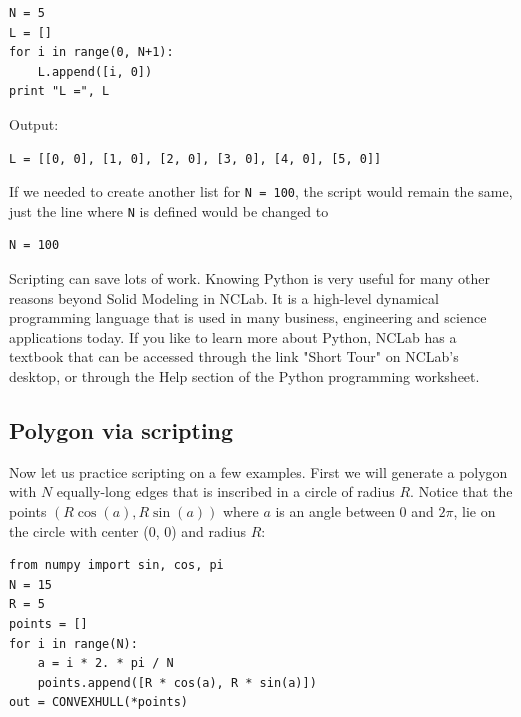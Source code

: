 \begin{bbox}
\begin{verbatim}
N = 5
L = []
for i in range(0, N+1):
    L.append([i, 0])
print "L =", L
\end{verbatim}
\end{bbox}
\vspace{6mm}

\noindent
Output:\\
\begin{ybox}
\begin{verbatim}
L = [[0, 0], [1, 0], [2, 0], [3, 0], [4, 0], [5, 0]]
\end{verbatim}
\end{ybox}
\vspace{6mm}

\noindent
If we needed to create another list for {\tt N = 100}, the script would remain the same,
just the line where {\tt N} is defined would be changed to \\

\begin{bbox}
\begin{verbatim}
N = 100
\end{verbatim}
\end{bbox}
\vspace{6mm}

\noindent
Scripting can save lots of work. Knowing Python is very useful for many other
reasons beyond Solid Modeling in NCLab. It is a high-level dynamical programming 
language that is used in many business, engineering and science applications 
today. If you like to learn more about Python, NCLab has a textbook that can be 
accessed through the link "Short Tour" on NCLab's desktop, or through the Help
section of the Python programming worksheet. 

\subsection{Polygon via scripting}\label{subsec:polygon}

Now let us practice scripting on a few examples.
First we will generate a polygon with $N$ equally-long 
edges that is inscribed in 
a circle of radius $R$. Notice that the points
$(R  \cos(a), R  \sin(a))$ where $a$ is an angle between 
$0$ and $2\pi$, lie on the circle with center (0, 0) and 
radius $R$:\\

\begin{bbox}
\begin{verbatim}
from numpy import sin, cos, pi
N = 15
R = 5
points = []
for i in range(N):
    a = i * 2. * pi / N
    points.append([R * cos(a), R * sin(a)])
out = CONVEXHULL(*points)
\end{verbatim}
\end{bbox}

